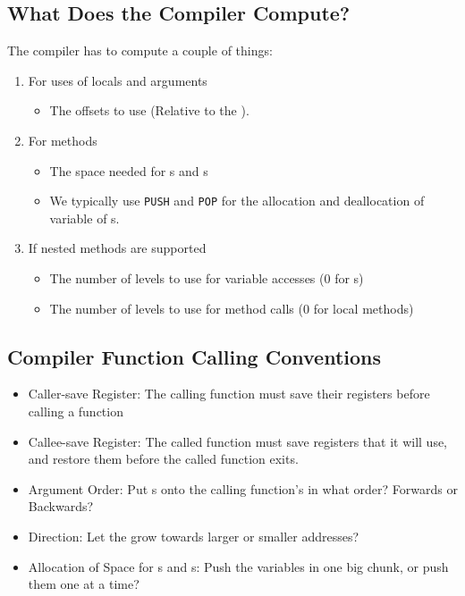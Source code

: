 \subsection{What Does the Compiler Compute?}\label{subsec:Compiler_Computation}
The compiler has to compute a couple of things:
\begin{enumerate}[noitemsep]
\item For uses of locals and arguments
  \begin{itemize}[noitemsep]
  \item The offsets to use (Relative to the ).
  \end{itemize}
\item For methods
  \begin{itemize}[noitemsep]
  \item The space needed for s and s
  \item We typically use \texttt{PUSH} and \texttt{POP} for the allocation and deallocation of variable of s.
  \end{itemize}
\item If nested methods are supported
  \begin{itemize}[noitemsep]
  \item The number of  levels to use for variable accesses (0 for s)
  \item The number of  levels to use for method calls (0 for local methods)
  \end{itemize}
\end{enumerate}

\subsection{Compiler Function Calling Conventions}\label{subsec:Compiler_Function_Call_Conventions}
\begin{itemize}[noitemsep]
\item Caller-save Register: The calling function must save their registers before calling a function
\item Callee-save Register: The called function must save registers that it will use, and restore them before the called function exits.
\item Argument Order: Put s onto the calling function's  in what order? Forwards or Backwards?
\item Direction: Let the  grow towards larger or smaller addresses?
\item Allocation of Space for s and s: Push the variables in one big chunk, or push them one at a time?
\end{itemize}


